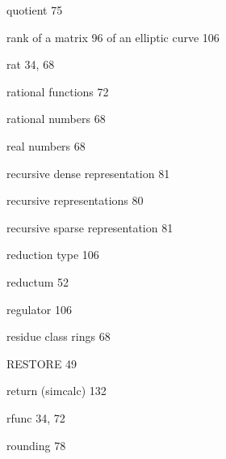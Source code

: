 \begin{theindex}
\indexspace

\item quotient 75

\indexspace

\item rank 
  \subitem of a matrix 96
  \subitem of an elliptic curve 106
\item rat 34, 68
\item rational functions 72
\item rational numbers 68
\item real numbers 68
\item recursive dense representation 81
\item recursive representations 80
\item recursive sparse representation 81
\item reduction type 106 
\item reductum 52
\item regulator 106
\item residue class rings 68
\item RESTORE 49
\item return (simcalc) 132
\item rfunc 34, 72
\item rounding 78

\indexspace


\end{theindex}

